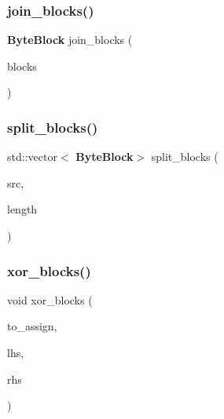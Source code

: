 \mbox{\label{mycrypto_8hpp_a861af53db13190f9c17d0e21ff72f6a2}} 
\subsubsection{join\+\_\+blocks()}
{\footnotesize\ttfamily \textbf{ Byte\+Block} join\+\_\+blocks (\begin{DoxyParamCaption}\item[{const std\+::vector$<$ \textbf{ Byte\+Block} $>$ \&}]{blocks }\end{DoxyParamCaption})}

\mbox{\label{mycrypto_8hpp_a32b4a8506e05aa9c639e834801053e6a}} 
\subsubsection{split\+\_\+blocks()}
{\footnotesize\ttfamily std\+::vector$<$\textbf{ Byte\+Block}$>$ split\+\_\+blocks (\begin{DoxyParamCaption}\item[{const \textbf{ Byte\+Block} \&}]{src,  }\item[{size\+\_\+t}]{length }\end{DoxyParamCaption})}

\mbox{\label{mycrypto_8hpp_a66b7e84b7ce7f030d3201391fb1d87a0}} 
\subsubsection{xor\+\_\+blocks()}
{\footnotesize\ttfamily void xor\+\_\+blocks (\begin{DoxyParamCaption}\item[{\textbf{ Byte\+Block} \&}]{to\+\_\+assign,  }\item[{const \textbf{ Byte\+Block} \&}]{lhs,  }\item[{const \textbf{ Byte\+Block} \&}]{rhs }\end{DoxyParamCaption})}

